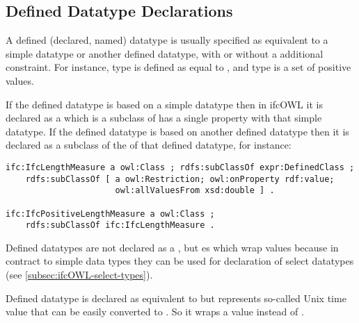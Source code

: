 \subsection{Defined Datatype Declarations}
\label{subsec:ifcOWL-defined-types}

A defined (declared, named) data\-type is usually specified as equivalent to a simple data\-type or another defined data\-type, with or without a additional constraint. For instance, type  is defined as equal to , and type  is a set of positive  values.

\begin{ontologyRule}
If the defined data\-type is based on a simple data\-type then in ifcOWL it is declared as a  which is a subclass of  has a single property  with that simple data\-type. If the defined data\-type is based on another defined data\-type then it is declared as a subclass of the  of that defined data\-type, for instance:

\begin{lstlisting}[aboveskip=3pt]
ifc:IfcLengthMeasure a owl:Class ; rdfs:subClassOf expr:DefinedClass ;
    rdfs:subClassOf [ a owl:Restriction; owl:onProperty rdf:value;
                      owl:allValuesFrom xsd:double ] .
                      
ifc:IfcPositiveLengthMeasure a owl:Class ;
    rdfs:subClassOf ifc:IfcLengthMeasure .
\end{lstlisting}
\end{ontologyRule}


Defined data\-types are not declared as a , but es which wrap  values because in contract to simple data types they can be used for declaration of select data\-types (see \ref{subsec:ifcOWL-select-types}).

Defined data\-type  is declared as equivalent to  but represents so-called Unix time value that can be easily converted to . So it wraps a  value instead of .



